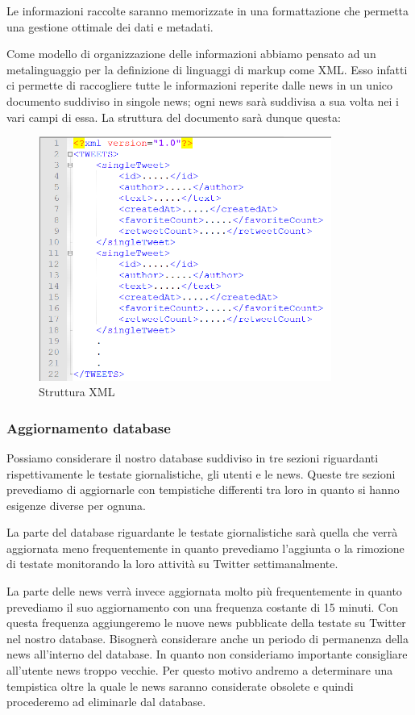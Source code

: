 \documentclass[12pt]{article}
\begin{document}
Le informazioni raccolte saranno memorizzate in una formattazione che permetta una gestione ottimale dei dati e metadati.

Come modello di organizzazione delle informazioni abbiamo pensato ad un metalinguaggio per la definizione di linguaggi di markup come XML. Esso infatti ci permette di raccogliere tutte le informazioni reperite dalle news in un unico documento suddiviso in singole news; ogni news sarà suddivisa a sua volta nei i vari campi di essa. 
La struttura del documento sarà dunque questa: 

\begin{figure}[h]
\centering
\includegraphics[height=8cm]{2.png}
\caption{Struttura XML}\label{fig:1}
\end{figure}

\subsubsection{Aggiornamento database}

Possiamo considerare il nostro database suddiviso in tre sezioni riguardanti rispettivamente le testate giornalistiche, gli utenti e le news. Queste tre sezioni prevediamo di aggiornarle con tempistiche differenti tra loro in quanto si hanno esigenze diverse per ognuna.

La parte del database riguardante le testate giornalistiche sarà quella che verrà aggiornata meno frequentemente in quanto prevediamo l'aggiunta o la rimozione di testate monitorando la loro attività su Twitter settimanalmente.

La parte delle news verrà invece aggiornata molto più frequentemente in quanto prevediamo il suo aggiornamento con una frequenza costante di 15 minuti. Con questa frequenza aggiungeremo le nuove news pubblicate della testate su Twitter nel nostro database.
Bisognerà considerare anche un periodo di permanenza della news all'interno del database. In quanto non consideriamo importante consigliare all'utente news troppo vecchie. Per questo motivo andremo a determinare una tempistica oltre la quale le news saranno considerate obsolete e quindi procederemo ad eliminarle dal database.
\end{document}
